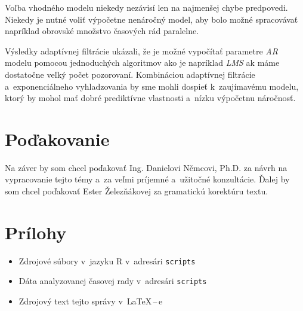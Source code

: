 \documentclass[12pt,a4paper,oneside,final]{article}
\theoremstyle{definition}
\theoremstyle{remark}
\numberwithin{equation}{section}
\begin{document}
Voľba vhodného modelu niekedy nezávisí len na najmenšej chybe predpovedi. Niekedy je nutné
voliť výpočetne nenáročný model, aby bolo možné spracovávať napríklad obrovské množstvo 
časových rád paralelne.

Výsledky adaptívnej filtrácie ukázali, že je možné vypočítať parametre \emph{AR} modelu
pomocou jednoduchých algoritmov ako je napríklad \emph{LMS} ak máme dostatočne veľký počet
pozorovaní. Kombináciou adaptívnej filtrácie a~exponenciálneho vyhladzovania by sme mohli 
dospieť k~zaujímavému modelu, ktorý by mohol mať dobré prediktívne vlastnosti a~nízku
výpočetnu náročnosť.

\section*{Poďakovanie}
Na záver by som chcel poďakovať Ing. Danielovi Němcovi, Ph.D. za návrh na vypracovanie
tejto témy a~za veľmi príjemné a~užitočné konzultácie. Ďalej by som chcel poďakovať Ester
Železňákovej za gramatickú korektúru textu.




\newpage
\renewcommand{\thesection}{\Alph{section}}
\setcounter{section}{0}
\renewcommand{\thepage}{\roman{page}}
\setcounter{page}{1}

\section{Prílohy}

\begin{itemize}
    \item Zdrojové súbory v~jazyku R v~adresári \texttt{scripts}
    \item Dáta analyzovanej časovej rady v~adresári \texttt{scripts}
    \item Zdrojový text tejto správy v~\LaTeX\,--\,e
\end{itemize}
\end{document}
